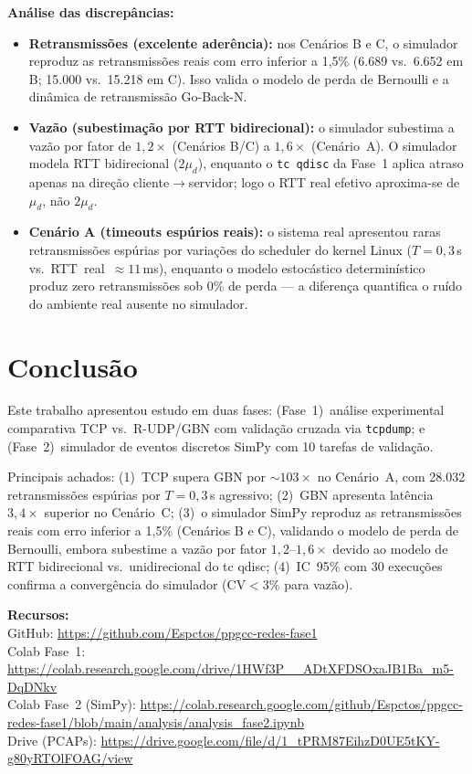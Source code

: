\documentclass[12pt]{article}
\begin{document}
\textbf{Análise das discrepâncias:}
\begin{itemize}
  \item \textbf{Retransmissões (excelente aderência):} nos Cenários B e C, o
    simulador reproduz as retransmissões reais com erro inferior a 1,5\%
    (6.689 vs.\ 6.652 em B; 15.000 vs.\ 15.218 em C). Isso valida o modelo de
    perda de Bernoulli e a dinâmica de retransmissão Go-Back-N.
  \item \textbf{Vazão (subestimação por RTT bidirecional):} o simulador subestima
    a vazão por fator de $1{,}2\times$ (Cenários B/C) a $1{,}6\times$ (Cenário~A).
    O simulador modela RTT bidirecional ($2\mu_d$), enquanto o \texttt{tc qdisc}
    da Fase~1 aplica atraso apenas na direção cliente$\to$servidor; logo o RTT real
    efetivo aproxima-se de $\mu_d$, não $2\mu_d$.
  \item \textbf{Cenário A (timeouts espúrios reais):} o sistema real apresentou
    raras retransmissões espúrias por variações do scheduler do kernel Linux
    ($T=0{,}3$\,s vs.\ RTT~real~$\approx 11$\,ms), enquanto o modelo estocástico
    determinístico produz zero retransmissões sob 0\% de perda — a diferença
    quantifica o ruído do ambiente real ausente no simulador.
\end{itemize}

\section{Conclusão}

Este trabalho apresentou estudo em duas fases: (Fase~1)~análise experimental
comparativa TCP vs.\ R-UDP/GBN com validação cruzada via \texttt{tcpdump}; e
(Fase~2)~simulador de eventos discretos SimPy com 10 tarefas de validação.

Principais achados: (1)~TCP supera GBN por $\sim103\times$ no Cenário~A, com
28.032 retransmissões espúrias por $T=0{,}3$\,s agressivo; (2)~GBN apresenta
latência $3{,}4\times$ superior no Cenário~C; (3)~o simulador SimPy reproduz as
retransmissões reais com erro inferior a 1,5\% (Cenários B e C), validando o
modelo de perda de Bernoulli, embora subestime a vazão por fator $1{,}2$--$1{,}6\times$
devido ao modelo de RTT bidirecional vs.\ unidirecional do tc qdisc; (4)~IC~95\%
com 30 execuções confirma a convergência do simulador ($\text{CV}<3\%$ para vazão).

\vspace{4pt}
\noindent\textbf{Recursos:}\\
GitHub: \url{https://github.com/Espctos/ppgcc-redes-fase1}\\
Colab Fase~1: \url{https://colab.research.google.com/drive/1HWf3P__ADtXFDSOxaJB1Ba_m5-DqDNkv}\\
Colab Fase~2 (SimPy): \url{https://colab.research.google.com/github/Espctos/ppgcc-redes-fase1/blob/main/analysis/analysis_fase2.ipynb}\\
Drive (PCAPs): \url{https://drive.google.com/file/d/1_tPRM87EihzD0UE5tKY-g80yRTOlFOAG/view}
\end{document}
